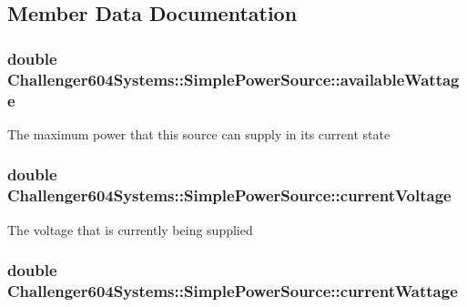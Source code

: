 \subsection{Member Data Documentation}
\hypertarget{class_challenger604_systems_1_1_simple_power_source_a4a74a3aadb987bae076113afbe9cec49}{
\subsubsection[{available\-Wattage}]{\setlength{\rightskip}{0pt plus 5cm}double Challenger604\-Systems\-::\-Simple\-Power\-Source\-::available\-Wattage\hspace{0.3cm}{\ttfamily [protected]}}}\label{class_challenger604_systems_1_1_simple_power_source_a4a74a3aadb987bae076113afbe9cec49}
The maximum power that this source can supply in its current state \hypertarget{class_challenger604_systems_1_1_simple_power_source_a06714fe17da09f4552da8a8766617032}{
\subsubsection[{current\-Voltage}]{\setlength{\rightskip}{0pt plus 5cm}double Challenger604\-Systems\-::\-Simple\-Power\-Source\-::current\-Voltage\hspace{0.3cm}{\ttfamily [protected]}}}\label{class_challenger604_systems_1_1_simple_power_source_a06714fe17da09f4552da8a8766617032}
The voltage that is currently being supplied \hypertarget{class_challenger604_systems_1_1_simple_power_source_a4cf363de2167ac9b478febb6e49c4866}{
\subsubsection[{current\-Wattage}]{\setlength{\rightskip}{0pt plus 5cm}double Challenger604\-Systems\-::\-Simple\-Power\-Source\-::current\-Wattage\hspace{0.3cm}{\ttfamily [protected]}}}\label{class_challenger604_systems_1_1_simple_power_source_a4cf363de2167ac9b478febb6e49c4866}

